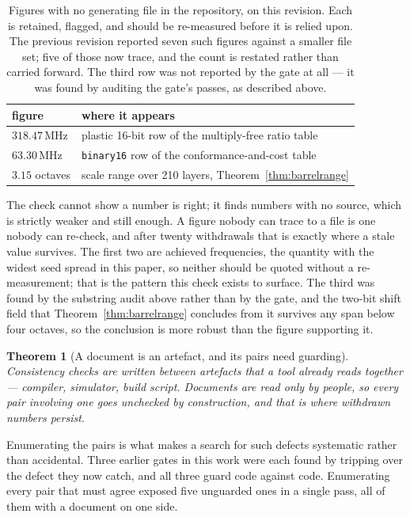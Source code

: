 \documentclass[11pt]{article}
\newtheorem{theorem}{Theorem}
\theoremstyle{definition}
\begin{document}
\begin{table}[t]\centering
\caption{Figures with no generating file in the repository, on this revision. Each
is retained, flagged, and should be re-measured before it is relied upon. The
previous revision reported seven such figures against a smaller file set; five of
those now trace, and the count is restated rather than carried forward. The third
row was not reported by the gate at all --- it was found by auditing the gate's
passes, as described above.}
\label{tab:untraced}
\begin{tabular}{ll}
\toprule
figure & where it appears \\
\midrule
$318.47$\,MHz & plastic 16-bit row of the multiply-free ratio table \\
$63.30$\,MHz & \texttt{binary16} row of the conformance-and-cost table \\
$3.15$ octaves & scale range over 210 layers, Theorem~\ref{thm:barrelrange} \\
\bottomrule
\end{tabular}
\end{table}

The check cannot show a number is right; it finds numbers with no source, which
is strictly weaker and still enough. A figure nobody can trace to a file is one
nobody can re-check, and after twenty withdrawals that is exactly where a stale
value survives. The first two are achieved frequencies, the quantity with the
widest seed spread in this paper, so neither should be quoted without a
re-measurement; that is the pattern this check exists to surface. The third was
found by the substring audit above rather than by the gate, and the two-bit shift
field that Theorem~\ref{thm:barrelrange} concludes from it survives any span below
four octaves, so the conclusion is more robust than the figure supporting it.

\begin{theorem}[A document is an artefact, and its pairs need guarding]
\label{thm:doctrace}
Consistency checks are written between artefacts that a tool already reads
together --- compiler, simulator, build script. Documents are read only by
people, so every pair involving one goes unchecked by construction, and that is
where withdrawn numbers persist.
\end{theorem}

Enumerating the pairs is what makes a search for such defects systematic rather
than accidental. Three earlier gates in this work were each found by tripping
over the defect they now catch, and all three guard code against code.
Enumerating every pair that must agree exposed five unguarded ones in a single
pass, all of them with a document on one side.
\end{document}
